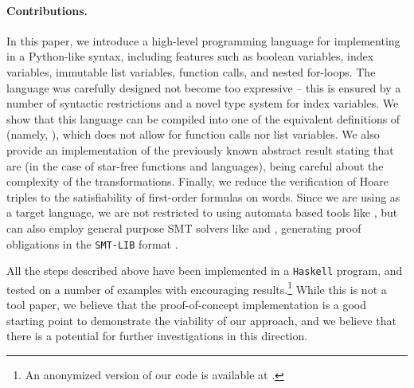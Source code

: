 \paragraph{Contributions.} \AP In this paper, we introduce a high-level
programming language for implementing 
in a Python-like syntax, including features such as boolean variables, index variables,
immutable list variables, function calls, and nested for-loops.
The language was carefully designed not become too expressive -- 
this is ensured by a number of syntactic restrictions and a novel type system
for index variables. We show that this language can be
compiled into one of the equivalent definitions of 
(namely, ), which does not allow for function calls nor
list variables. We also provide an implementation of the previously known
abstract result stating that  are  (in the case of star-free functions and languages), being careful
about the complexity of the transformations. Finally, we reduce the
verification of Hoare triples to the satisfiability of first-order formulas on
words. Since we are using  as a target language, we are
not restricted to using automata based tools like  \cite{MONA01},
but can also employ general purpose SMT solvers like  \cite{z3} and
 \cite{cvc5}, generating proof obligations in the \texttt{SMT-LIB}
format \cite{BARRETT17}.

All the steps described above have been implemented in a \texttt{Haskell}
program, and tested on a number of examples with encouraging
results.\footnote{An anonymized version of our code is available at
\repositoryUrl.} While this is not a tool paper, we believe that the
proof-of-concept implementation is a good starting point to demonstrate the viability of
our approach, and we believe that there is a potential for further
investigations in this direction.


